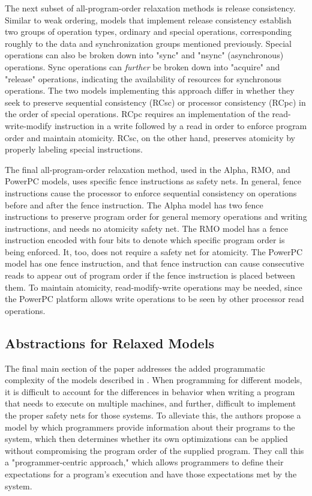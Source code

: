 \documentclass{article}
\begin{document}
\par The next subset of all-program-order relaxation methods is release consistency. Similar to weak ordering, models that implement release consistency establish two groups of operation types, ordinary and special operations, corresponding roughly to the data and synchronization groups mentioned previously. 
Special operations can also be broken down into "sync" and "nsync" (asynchronous) operations.
Sync operations can \textit{further} be broken down into "acquire" and "release" operations, indicating the availability of resources for synchronous operations.
The two models implementing this approach differ in whether they seek to preserve sequential consistency (RCsc) or processor consistency (RCpc) in the order of special operations.
RCpc requires an implementation of the read-write-modify instruction in a write followed by a read in order to enforce program order and maintain atomicity.
RCsc, on the other hand, preserves atomicity by properly labeling special instructions.

\par The final all-program-order relaxation method, used in the Alpha, RMO, and PowerPC models, uses specific fence instructions as safety nets.
In general, fence instructions cause the processor to enforce sequential consistency on operations before and after the fence instruction.
The Alpha model has two fence instructions to preserve program order for general memory operations and writing instructions, and needs no atomicity safety net.
The RMO model has a fence instruction encoded with four bits to denote which specific program order is being enforced. It, too, does not require a safety net for atomicity.
The PowerPC model has one fence instruction, and that fence instruction can cause consecutive reads to appear out of program order if the fence instruction is placed between them. To maintain atomicity, read-modify-write operations may be needed, since the PowerPC platform allows write operations to be seen by other processor read operations.

\subsection{Abstractions for Relaxed Models}
\par The final main section of the paper addresses the added programmatic complexity of the models described in .
When programming for different models, it is difficult to account for the differences in behavior when writing a program that needs to execute on multiple machines, and further, difficult to implement the proper safety nets for those systems.
To alleviate this, the authors propose a model by which programmers provide information about their programs to the system, which then determines whether its own optimizations can be applied without compromising the program order of the supplied program.
They call this a "programmer-centric approach," which allows programmers to define their expectations for a program's execution and have those expectations met by the system.
\end{document}
